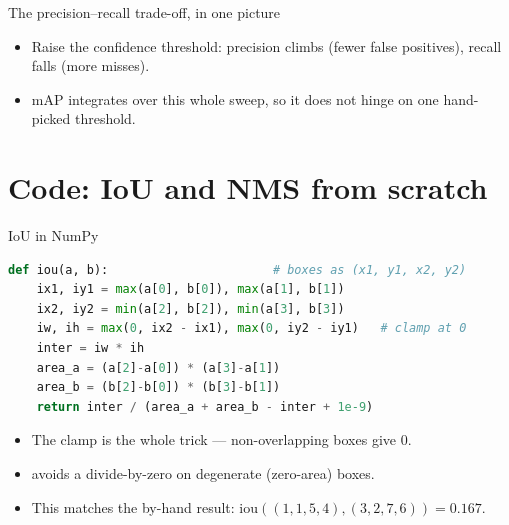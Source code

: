 \documentclass[10pt,aspectratio=169]{beamer}
\begin{document}
\begin{frame}{The precision--recall trade-off, in one picture}
  \begin{center}
  \end{center}
  \begin{itemize}
    \item Raise the confidence threshold: precision climbs (fewer false positives), recall falls (more misses).
    \item mAP integrates over this whole sweep, so it does not hinge on one hand-picked threshold.
  \end{itemize}
\end{frame}

\section{Code: IoU and NMS from scratch}

\begin{frame}[fragile]{IoU in NumPy}
\begin{lstlisting}[language=Python]
def iou(a, b):                       # boxes as (x1, y1, x2, y2)
    ix1, iy1 = max(a[0], b[0]), max(a[1], b[1])
    ix2, iy2 = min(a[2], b[2]), min(a[3], b[3])
    iw, ih = max(0, ix2 - ix1), max(0, iy2 - iy1)   # clamp at 0
    inter = iw * ih
    area_a = (a[2]-a[0]) * (a[3]-a[1])
    area_b = (b[2]-b[0]) * (b[3]-b[1])
    return inter / (area_a + area_b - inter + 1e-9)
\end{lstlisting}
  \begin{itemize}
    \item The  clamp is the whole trick --- non-overlapping boxes give $0$.
    \item {} avoids a divide-by-zero on degenerate (zero-area) boxes.
    \item This matches the by-hand result: $\text{iou}((1,1,5,4),(3,2,7,6))=0.167$.
  \end{itemize}
\end{frame}
\end{document}
